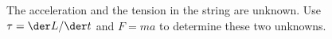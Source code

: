The acceleration and the tension in the string are unknown.
Use $\tau=\der L/\der t$ and $F=ma$ to determine these two unknowns.
